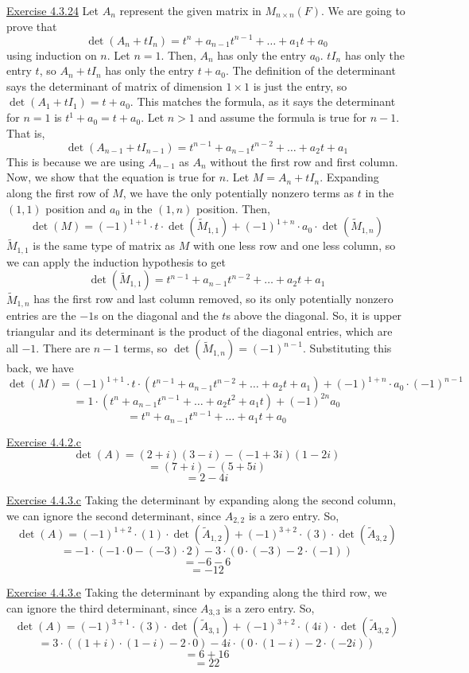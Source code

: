 \documentclass{exam}
\begin{document}
\underline{Exercise 4.3.24}
\newline
\newline
Let $A_n$ represent the given matrix in $M_{n\times n}(F)$. We are going to prove that \[\det(A_n+tI_n)=t^n+a_{n-1}t^{n-1}+\dots+a_1t+a_0\] using induction on $n$. Let $n=1$. Then, $A_n$ has only the entry $a_0$. $tI_n$ has only the entry $t$, so $A_n+tI_n$ has only the entry $t+a_0$. The definition of the determinant says the determinant of matrix of dimension $1\times1$ is just the entry, so $\det(A_1+tI_1)=t+a_0$. This matches the formula, as it says the determinant for $n=1$ is $t^1+a_0=t+a_0$. Let $n>1$ and assume the formula is true for $n-1$. That is, \[\det(A_{n-1}+tI_{n-1})=t^{n-1}+a_{n-1}t^{n-2}+\dots+a_2t+a_1\] This is because we are using $A_{n-1}$ as $A_n$ without the first row and first column. Now, we show that the equation is true for $n$. Let $M=A_n+tI_n$. Expanding along the first row of $M$, we have the only potentially nonzero terms as $t$ in the $(1,1)$ position and $a_0$ in the $(1,n)$ position. Then, \[\det(M)=(-1)^{1+1}\cdot t\cdot\det(\tilde{M}_{1,1})+(-1)^{1+n}\cdot a_0\cdot\det(\tilde{M}_{1,n})\] $\tilde{M}_{1,1}$ is the same type of matrix as $M$ with one less row and one less column, so we can apply the induction hypothesis to get \[\det(\tilde{M}_{1,1})=t^{n-1}+a_{n-1}t^{n-2}+\dots+a_2t+a_1\]$\tilde{M}_{1,n}$ has the first row and last column removed, so its only potentially nonzero entries are the $-1$s on the diagonal and the $t$s above the diagonal. So, it is upper triangular and its determinant is the product of the diagonal entries, which are all $-1$. There are $n-1$ terms, so $\det(\tilde{M}_{1,n})=(-1)^{n-1}$. Substituting this back, we have \[\det(M)=(-1)^{1+1}\cdot t\cdot(t^{n-1}+a_{n-1}t^{n-2}+\dots+a_2t+a_1)+(-1)^{1+n}\cdot a_0\cdot(-1)^{n-1}\]
\[=1\cdot(t^n+a_{n-1}t^{n-1}+\dots+a_2t^2+a_1t)+(-1)^{2n}a_0\]
\[=t^n+a_{n-1}t^{n-1}+\dots+a_1t+a_0\]
\newline

\underline{Exercise 4.4.2.c}
\newline
\newline
\[\det(A)=(2+i)(3-i)-(-1+3i)(1-2i)\]
\[=(7+i)-(5+5i)\]
\[=2-4i\]
\newline

\underline{Exercise 4.4.3.c}
\newline
\newline
Taking the determinant by expanding along the second column, we can ignore the second determinant, since $A_{2,2}$ is a zero entry. So,
\[\det(A)=(-1)^{1+2}\cdot(1)\cdot\det(\tilde{A}_{1,2})+(-1)^{3+2}\cdot(3)\cdot\det(\tilde{A}_{3,2})\]
\[=-1\cdot(-1\cdot0-(-3)\cdot2)-3\cdot(0\cdot(-3)-2\cdot(-1))\]
\[=-6-6\]
\[=-12\]
\newline

\underline{Exercise 4.4.3.e}
\newline
\newline
Taking the determinant by expanding along the third row, we can ignore the third determinant, since $A_{3,3}$ is a zero entry. So,
\[\det(A)=(-1)^{3+1}\cdot(3)\cdot\det(\tilde{A}_{3,1})+(-1)^{3+2}\cdot(4i)\cdot\det(\tilde{A}_{3,2})\]
\[=3\cdot((1+i)\cdot(1-i)-2\cdot0)-4i\cdot(0\cdot(1-i)-2\cdot(-2i))\]
\[=6+16\]
\[=22\]
\newline
\end{document}
